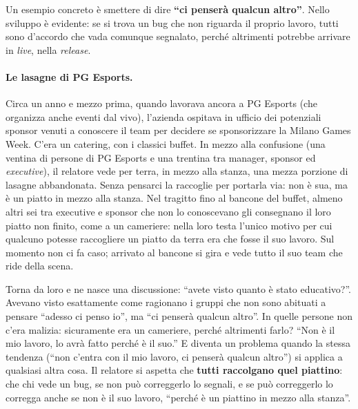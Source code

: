 Un esempio concreto è smettere di dire \textbf{``ci penserà qualcun altro''}. Nello sviluppo è
evidente: se si trova un bug che non riguarda il proprio lavoro, tutti sono d'accordo che vada
comunque segnalato, perché altrimenti potrebbe arrivare in \emph{live}, nella \emph{release}.

\paragraph{Le lasagne di PG Esports.} Circa un anno e mezzo prima, quando lavorava ancora a PG
Esports (che organizza anche eventi dal vivo), l'azienda ospitava in ufficio dei potenziali sponsor
venuti a conoscere il team per decidere se sponsorizzare la Milano Games Week. C'era un catering, con
i classici buffet. In mezzo alla confusione (una ventina di persone di PG Esports e una trentina tra
manager, sponsor ed \emph{executive}), il relatore vede per terra, in mezzo alla stanza, una mezza
porzione di lasagne abbandonata. Senza pensarci la raccoglie per portarla via: non è sua, ma è un
piatto in mezzo alla stanza. Nel tragitto fino al bancone del buffet, almeno altri sei tra executive e
sponsor che non lo conoscevano gli consegnano il loro piatto non finito, come a un cameriere: nella
loro testa l'unico motivo per cui qualcuno potesse raccogliere un piatto da terra era che fosse il
suo lavoro. Sul momento non ci fa caso; arrivato al bancone si gira e vede tutto il suo team che ride
della scena.

Torna da loro e ne nasce una discussione: ``avete visto quanto è stato educativo?''. Avevano visto
esattamente come ragionano i gruppi che non sono abituati a pensare ``adesso ci penso io'', ma ``ci
penserà qualcun altro''. In quelle persone non c'era malizia: sicuramente era un cameriere, perché
altrimenti farlo? ``Non è il mio lavoro, lo avrà fatto perché è il suo.'' E diventa un problema quando
la stessa tendenza (``non c'entra con il mio lavoro, ci penserà qualcun altro'') si applica a
qualsiasi altra cosa. Il relatore si aspetta che \textbf{tutti raccolgano quel piattino}: che chi vede
un bug, se non può correggerlo lo segnali, e se può correggerlo lo corregga anche se non è il suo
lavoro, ``perché è un piattino in mezzo alla stanza''.

